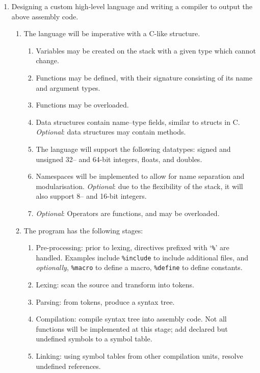 \documentclass{article}
\begin{document}
\begin{enumerate}
        \item Designing a custom high-level language and writing a compiler to output the above assembly code.
        \begin{enumerate}
            \item The language will be imperative with a C-like structure.
            \begin{enumerate}
                \item Variables may be created on the stack with a given type which cannot change.
                \item Functions may be defined, with their signature consisting of its name and argument types.
                \item Functions may be overloaded.
                \item Data structures contain name--type fields, similar to structs in C.
                \textit{Optional}: data structures may contain methods.
                \item The language will support the following datatypes: signed and unsigned 32-- and 64-bit integers, floats, and doubles.
                \item Namespaces will be implemented to allow for name separation and modularisation.
                \textit{Optional}: due to the flexibility of the stack, it will also support 8-- and 16-bit integers.
                \item \textit{Optional}: Operators are functions, and may be overloaded.
            \end{enumerate}
            \item The program has the following stages:
            \begin{enumerate}
                \item Pre-processing: prior to lexing, directives prefixed with `\texttt{\%}' are handled.
                Examples include \texttt{\%include} to include additional files, and \textit{optionally}, \texttt{\%macro} to define a macro, \texttt{\%define} to define constants.
                \item Lexing: scan the source and transform into tokens.
                \item Parsing: from tokens, produce a syntax tree.
                \item Compilation: compile syntax tree into assembly code.
                Not all functions will be implemented at this stage; add declared but undefined symbols to a symbol table.
                \item Linking: using symbol tables from other compilation units, resolve undefined references.

\end{enumerate}
\end{enumerate}
\end{enumerate}
\end{document}
